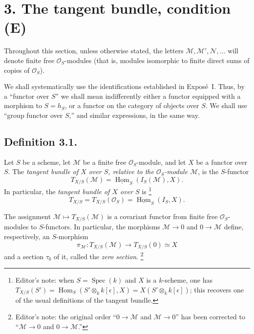 
\section*{3. The tangent bundle, condition (E)}

Throughout this section, unless otherwise stated, the letters
\(\mathcal M,\mathcal M',\mathcal N,\ldots\) will denote finite free
\(\mathcal O_S\)-modules (that is, modules isomorphic to finite direct sums
of copies of \(\mathcal O_S\)).

We shall systematically use the identifications established in Expos\'e~I.
Thus, by a ``functor over \(S\)'' we shall mean indifferently either a
functor equipped with a morphism to \(S=h_S\), or a functor on the category
of objects over \(S\). We shall use ``group functor over \(S\),'' and
similar expressions, in the same way.

\subsection*{Definition 3.1.}
Let \(S\) be a scheme, let \(\mathcal M\) be a finite free
\(\mathcal O_S\)-module, and let \(X\) be a functor over \(S\). The
\emph{tangent bundle of \(X\) over \(S\), relative to the
\(\mathcal O_S\)-module \(\mathcal M\)}, is the \(S\)-functor
\[
  T_{X/S}(\mathcal M)
  =\underline{\operatorname{Hom}}_S(I_S(\mathcal M),X).
\]
In particular, the \emph{tangent bundle of \(X\) over \(S\)} is
\footnote{Editor's note: when \(S=\operatorname{Spec}(k)\) and \(X\) is a
\(k\)-scheme, one has
\(T_{X/S}(S')=\operatorname{Hom}_S(S'\otimes_k k[\epsilon],X)
=X(S'\otimes_k k[\epsilon])\); this recovers one of the usual definitions
of the tangent bundle.}
\[
  T_{X/S}=T_{X/S}(\mathcal O_S)
  =\underline{\operatorname{Hom}}_S(I_S,X).
\]

The assignment \(\mathcal M\mapsto T_{X/S}(\mathcal M)\) is a covariant
functor from finite free \(\mathcal O_S\)-modules to \(S\)-functors. In
particular, the morphisms \(\mathcal M\to0\) and \(0\to\mathcal M\)
define, respectively, an \(S\)-morphism
\[
  \pi_{\mathcal M}:T_{X/S}(\mathcal M)\longrightarrow
  T_{X/S}(0)\simeq X
\]
and a section \(\tau_0\) of it, called the \emph{zero section}.
\footnote{Editor's note: the original order ``\(0\to\mathcal M\) and
\(\mathcal M\to0\)'' has been corrected to ``\(\mathcal M\to0\) and
\(0\to\mathcal M\).''}

